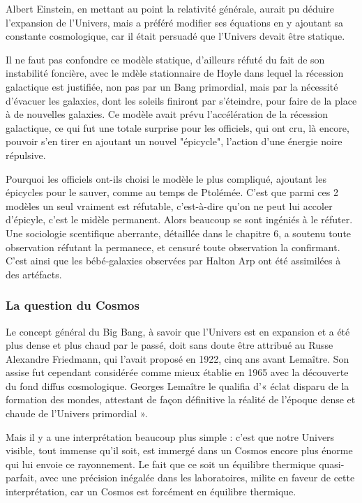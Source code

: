 \documentclass[a4paper,12pt]{article}
\begin{document}
Albert Einstein, en mettant au point la relativité générale, aurait pu déduire l'expansion de l'Univers, mais a préféré modifier ses équations en y ajoutant sa constante cosmologique, car il était persuadé que l'Univers devait être statique.


Il ne faut pas confondre ce modèle statique, d'ailleurs réfuté du fait de son instabilité foncière, avec le mdèle stationnaire de Hoyle dans lequel la récession galactique est justifiée, non pas par un Bang primordial, mais par la nécessité d'évacuer les galaxies, dont les soleils finiront par s'éteindre, pour faire de la place à de nouvelles galaxies. Ce modèle avait prévu l'accélération de la récession galactique, ce qui fut une totale surprise pour les officiels, qui ont cru, là encore, pouvoir s'en tirer en ajoutant un nouvel "épicycle", l'action d'une énergie noire répulsive. 


Pourquoi les officiels ont-ils choisi le modèle le plus compliqué, ajoutant les épicycles pour le sauver, comme au temps de Ptolémée. C'est que parmi ces 2 modèles un seul vraiment est réfutable, c'est-à-dire qu'on ne peut lui accoler d'épicyle, c'est le midèle permanent. Alors beaucoup se sont ingéniés à le réfuter. Une sociologie scentifique aberrante, détaillée dans le chapitre 6, a soutenu toute observation réfutant la permanece, et censuré toute observation la confirmant. C'est ainsi que les bébé-galaxies observées par Halton Arp ont été assimilées à des artéfacts.  


\subsubsection{La question du Cosmos}
Le concept général du Big Bang, à savoir que l’Univers est en expansion et a été plus dense et plus chaud par le passé, doit sans doute être attribué au Russe Alexandre Friedmann, qui l'avait proposé en 1922, cinq ans avant Lemaître. Son assise fut cependant considérée comme mieux établie en 1965 avec la découverte du fond diffus cosmologique. Georges Lemaître le qualifia d’« éclat disparu de la formation des mondes, attestant de façon définitive la réalité de l’époque dense et chaude de l’Univers primordial ». 

Mais il y a une interprétation beaucoup plus simple : c'est que notre Univers visible, tout immense qu'il soit, est immergé dans un Cosmos encore plus énorme qui lui envoie ce rayonnement. Le fait que ce soit un équilibre thermique quasi-parfait, avec une précision inégalée dans les laboratoires, milite en faveur de cette interprétation, car un Cosmos est forcément en équilibre thermique. 
\end{document}

